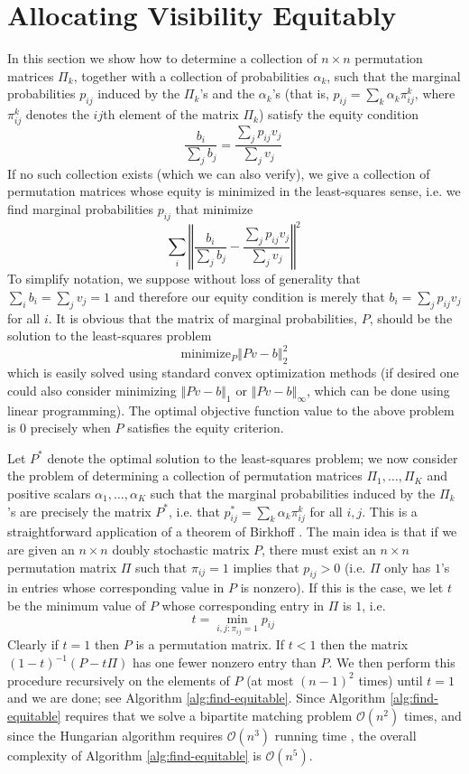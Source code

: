 \documentclass[prodmode,acmec]{acmsmall}
\begin{document}
\section{Allocating Visibility Equitably}
In this section we show how to determine a collection of $n\times
n$ permutation matrices $\Pi_{k}$, together with a collection of
probabilities $\alpha_{k}$, such that the marginal probabilities
$p_{ij}$ induced by the $\Pi_{k}$'s and the $\alpha_{k}$'s (that is,
$p_{ij}=\sum_{k}\alpha_{k}\pi_{ij}^{k}$, where $\pi_{ij}^{k}$ denotes
the $ij$th element of the matrix $\Pi_{k}$) satisfy the equity
condition\[
\frac{b_{i}}{\sum_{j}b_{j}}=\frac{\sum_{j}p_{ij}v_{j}}{\sum_{j}v_{j}}\,\]
If no such collection exists (which we can also verify), we give a
collection of permutation matrices whose equity is minimized in the
least-squares sense, i.e. we find marginal probabilities $p_{ij}$ that
minimize\[ \sum_{i}\left\Vert
\frac{b_{i}}{\sum_{j}b_{j}}-\frac{\sum_{j}p_{ij}v_{j}}{\sum_{j}v_{j}}\right\Vert
^{2}\,\] To simplify notation, we suppose without loss of generality
that $\sum_{i}b_{i}=\sum_{j}v_{j}=1$ and therefore our equity
condition is merely that $b_{i}=\sum_{j}p_{ij}v_{j}$ for all $i$. It
is obvious that the matrix of marginal probabilities, $P$, should be
the solution to the least-squares problem\[
\mathrm{minimize}_{P}\left\Vert Pv-b\right\Vert _{2}^{2}\] which is
easily solved using standard convex optimization methods (if desired
one could also consider minimizing $\left\Vert Pv-b\right\Vert _{1}$
or $\left\Vert Pv-b\right\Vert _{\infty}$, which can be done using
linear programming). The optimal objective function value to the above
problem is $0$ precisely when $P$ satisfies the equity criterion.

Let $P^{*}$ denote the optimal solution to the least-squares problem;
we now consider the problem of determining a collection of permutation
matrices $\Pi_{1},\dots,\Pi_{K}$ and positive scalars $\alpha_{1},\dots,\alpha_{K}$
such that the marginal probabilities induced by the $\Pi_{k}$'s are
precisely the matrix $P^{*}$, i.e. that $p_{ij}^{*}=\sum_{k}\alpha_{k}\pi_{ij}^{k}$
for all $i,j$. This is a straightforward application of a theorem
of Birkhoff \cite{marcus}. The main idea is that if we are given
an $n\times n$ doubly stochastic matrix $P$, there must exist an
$n\times n$ permutation matrix $\Pi$ such that $\pi_{ij}=1$ implies
that $p_{ij}>0$ (i.e. $\Pi$ only has $1$'s in entries whose corresponding
value in $P$ is nonzero). If this is the case, we let $t$ be the
minimum value of $P$ whose corresponding entry in $\Pi$ is $1$,
i.e. \[
t=\min_{i,j:\pi_{ij}=1}p_{ij}\,\]
Clearly if $t=1$ then $P$ is a permutation matrix. If $t<1$ then
the matrix $(1-t)^{-1}(P-t\Pi)$ has one fewer nonzero entry than
$P$. We then perform this procedure recursively on the elements of
$P$ (at most $(n-1)^{2}$ times) until $t=1$ and we are done; see
Algorithm \ref{alg:find-equitable}.  Since Algorithm \ref{alg:find-equitable} requires that we solve a bipartite matching problem $\mathcal{O}(n^2)$ times, and since the Hungarian algorithm requires $\mathcal{O}(n^3)$ running time \cite{burkard2009assignment}, the overall complexity of Algorithm \ref{alg:find-equitable} is $\mathcal{O}(n^5)$.
\end{document}

